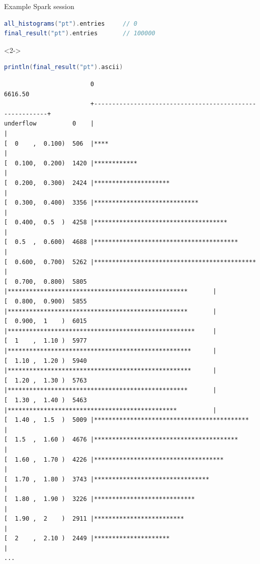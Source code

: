 \documentclass{beamer}
\begin{document}
\begin{frame}[fragile]{Example Spark session}
\begin{lstlisting}[language=scala]
all_histograms("pt").entries     // 0
final_result("pt").entries       // 100000
\end{lstlisting}

\begin{uncoverenv}<2->
\begin{lstlisting}[language=scala]
println(final_result("pt").ascii)
\end{lstlisting}
\tiny
\begin{verbatim}
                        0                                                   6616.50
                        +---------------------------------------------------------+
underflow          0    |                                                         |
[  0    ,  0.100)  506  |****                                                     |
[  0.100,  0.200)  1420 |************                                             |
[  0.200,  0.300)  2424 |*********************                                    |
[  0.300,  0.400)  3356 |*****************************                            |
[  0.400,  0.5  )  4258 |*************************************                    |
[  0.5  ,  0.600)  4688 |****************************************                 |
[  0.600,  0.700)  5262 |*********************************************            |
[  0.700,  0.800)  5805 |**************************************************       |
[  0.800,  0.900)  5855 |**************************************************       |
[  0.900,  1    )  6015 |****************************************************     |
[  1    ,  1.10 )  5977 |***************************************************      |
[  1.10 ,  1.20 )  5940 |***************************************************      |
[  1.20 ,  1.30 )  5763 |**************************************************       |
[  1.30 ,  1.40 )  5463 |***********************************************          |
[  1.40 ,  1.5  )  5009 |*******************************************              |
[  1.5  ,  1.60 )  4676 |****************************************                 |
[  1.60 ,  1.70 )  4226 |************************************                     |
[  1.70 ,  1.80 )  3743 |********************************                         |
[  1.80 ,  1.90 )  3226 |****************************                             |
[  1.90 ,  2    )  2911 |*************************                                |
[  2    ,  2.10 )  2449 |*********************                                    |
...
\end{verbatim}
\end{uncoverenv}
\end{frame}
\end{document}
